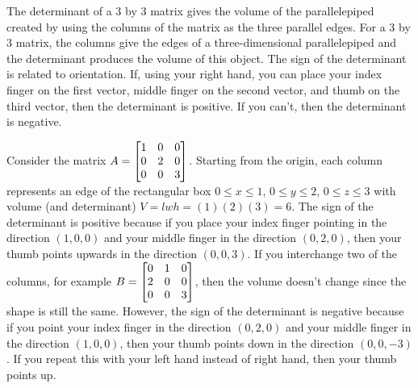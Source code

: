 {{The determinant of a 3 by 3 matrix gives the volume of the parallelepiped created by using the columns of the matrix as the three parallel edges.} 
For a 3 by 3 matrix, the columns give the edges of a three-dimensional parallelepiped and the determinant produces the volume of this object. The sign of the determinant is related to orientation. If, using your right hand, you can place your index finger on the first vector, middle finger on the second vector, and thumb on the third vector, then the determinant is positive.  If you can't, then the determinant is negative.
\begin{example}
Consider the matrix $A = \begin{bmatrix}\begin{matrix} 1\\0\\0 \end{matrix}&\begin{matrix} 0\\2\\0 \end{matrix}&\begin{matrix} 0\\0\\3 \end{matrix}\end{bmatrix}$.  Starting from the origin, each column represents an edge of the rectangular box 
$0\leq x\leq 1$, 
$0\leq y\leq 2$, 
$0\leq z\leq 3$ with volume (and determinant) $V=lwh=(1)(2)(3)=6$. The sign of the determinant is positive because if you place your index finger pointing in the direction $(1,0,0)$ and your middle finger in the direction $(0,2,0)$, then your thumb points upwards in the direction $(0,0,3)$. 
If you interchange two of the columns, for example 
$B = \begin{bmatrix}\begin{matrix} 0\\2\\0 \end{matrix}&\begin{matrix} 1\\0\\0 \end{matrix}&\begin{matrix} 0\\0\\3 \end{matrix}\end{bmatrix}$, then the volume doesn't change since the shape is still the same. However, the sign of the determinant is negative because if you point your index finger in the direction $(0,2,0)$ and your middle finger in the direction $(1,0,0)$, then your thumb points down in the direction $(0,0,-3)$. If you repeat this with your left hand instead of right hand, then your thumb points up.
\end{example}

}
